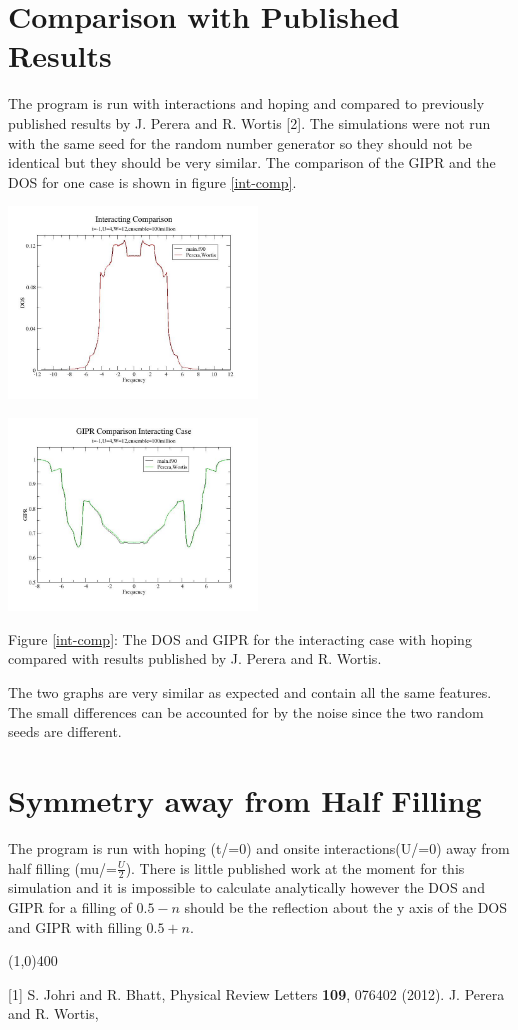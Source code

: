 \documentclass{article}
\begin{document}
\section{Comparison with Published Results}
The program is run with interactions and hoping and compared to previously published results by J. Perera and R. Wortis [2]. The simulations were not run with the same seed for the random number generator so they should not be identical but they should be very similar. The comparison of the GIPR and the DOS for one case is shown in figure \ref{int-comp}.
\begin{multicols}{2}
\begin{center}
	\includegraphics[width=250px]{dos_compareu4.jpg} \\ \label{int-comp}
\end{center}
\begin{center}
	\includegraphics[width=250px]{gipr_compareu4.jpg} \\
\end{center}
\end{multicols}
\begin{center}
Figure \ref{int-comp}: The DOS and GIPR for the interacting case with hoping compared with results published by J. Perera and R. Wortis.
\end{center}
The two graphs are very similar as expected and contain all the same features. The small differences can be accounted for by the noise since the two random seeds are different.
\section{Symmetry away from Half Filling}
The program is run with hoping (t/=0) and onsite interactions(U/=0) away from half filling (mu/=$\frac{U}{2}$). There is little published work at the moment for this simulation and it is impossible to calculate analytically however the DOS and GIPR for a filling of $0.5-n$ should be the reflection about the y axis of the DOS and GIPR with filling $0.5+n$.
\begin{center}
	\line(1,0){400}
\end{center}
[1] S. Johri and R. Bhatt, Physical Review Letters \textbf{109}, 076402 (2012). \newline
[2] J. Perera and R. Wortis,
\end{document}
